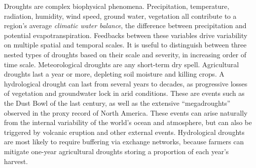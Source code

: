 \documentclass[11pt]{wlscirep}
\begin{document}
Droughts are complex biophysical phenomena. Precipitation, temperature, radiation, humidity, wind speed, ground water, vegetation all contribute to a region's average \textit{climatic water balance}, the difference between precipitation and potential evapotranspiration. Feedbacks between these variables drive variability on multiple spatial and temporal scales. It is useful to distinguish between three nested types of droughts based on their scale and severity, in increasing order of time scale. Meteorological droughts are any short-term dry spell. Agricultural droughts last a year or more, depleting soil moisture and killing crops. A hydrological drought can last from several years to decades, as progressive losses of vegetation and groundwater lock in arid conditions. These are events such as the Dust Bowl of the last century, as well as the extensive ``megadroughts'' observed in the proxy record of North America. These events can arise naturally from the internal variability of the world's ocean and atmosphere, but can also be triggered by volcanic eruption and other external events. Hydrological droughts are most likely to require buffering via exchange networks, because farmers can mitigate one-year agricultural droughts storing a proportion of each year’s harvest.
\end{document}
